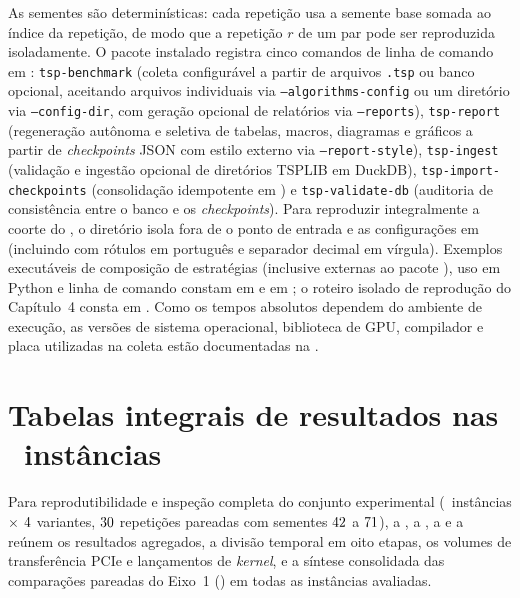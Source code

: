 As sementes são determinísticas: cada repetição usa a semente base somada ao índice da repetição, de modo que a repetição \(r\) de um par pode ser reproduzida isoladamente.
O pacote instalado registra cinco comandos de linha de comando em : \texttt{tsp-benchmark} (coleta configurável a partir de arquivos \texttt{.tsp} ou banco opcional, aceitando arquivos individuais via \texttt{--algorithms-config} ou um diretório via \texttt{--config-dir}, com geração opcional de relatórios via \texttt{--reports}), \texttt{tsp-report} (regeneração autônoma e seletiva de tabelas, macros, diagramas e gráficos a partir de \emph{checkpoints} JSON com estilo externo via \texttt{--report-style}), \texttt{tsp-ingest} (validação e ingestão opcional de diretórios TSPLIB em DuckDB), \texttt{tsp-import-checkpoints} (consolidação idempotente em ) e \texttt{tsp-validate-db} (auditoria de consistência entre o banco e os \emph{checkpoints}).
Para reproduzir integralmente a coorte do , o diretório  isola fora de  o ponto de entrada  e as configurações em  (incluindo  com rótulos em português e separador decimal em vírgula).
Exemplos executáveis de composição de estratégias (inclusive externas ao pacote ), uso em Python e linha de comando constam em  e em ; o roteiro isolado de reprodução do Capítulo~4 consta em .
Como os tempos absolutos dependem do ambiente de execução, as versões de sistema operacional, biblioteca de GPU, compilador e placa utilizadas na coleta estão documentadas na .

\section{Tabelas integrais de resultados nas \totalinstancias\ instâncias}\label{apendice-resultados}

Para reprodutibilidade e inspeção completa do conjunto experimental (\totalinstancias\ instâncias \(\times\) \(4\) variantes, \(30\) repetições pareadas com sementes \(42\) a \(71\)), a , a , a  e a  reúnem os resultados agregados, a divisão temporal em oito etapas, os volumes de transferência PCIe e lançamentos de \emph{kernel}, e a síntese consolidada das comparações pareadas do Eixo~1 () em todas as instâncias avaliadas.

